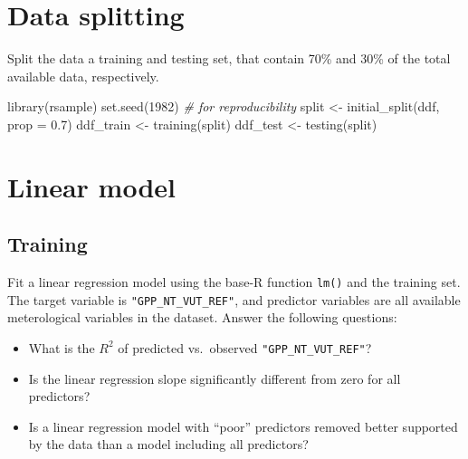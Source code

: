\documentclass[
]{book}
\newenvironment{Shaded}{\begin{snugshade}}{\end{snugshade}}
\newcommand{\AttributeTok}[1]{\textcolor[rgb]{0.77,0.63,0.00}{#1}}
\newcommand{\CommentTok}[1]{\textcolor[rgb]{0.56,0.35,0.01}{\textit{#1}}}
\newcommand{\DecValTok}[1]{\textcolor[rgb]{0.00,0.00,0.81}{#1}}
\newcommand{\FloatTok}[1]{\textcolor[rgb]{0.00,0.00,0.81}{#1}}
\newcommand{\FunctionTok}[1]{\textcolor[rgb]{0.00,0.00,0.00}{#1}}
\newcommand{\NormalTok}[1]{#1}
\newcommand{\OtherTok}[1]{\textcolor[rgb]{0.56,0.35,0.01}{#1}}
\providecommand{\tightlist}{%
  \setlength{\itemsep}{0pt}\setlength{\parskip}{0pt}}
\begin{document}
\hypertarget{data-splitting-2}{%
\section{Data splitting}\label{data-splitting-2}}

Split the data a training and testing set, that contain 70\% and 30\% of the total available data, respectively.

\begin{Shaded}
\begin{Highlighting}[]
\FunctionTok{library}\NormalTok{(rsample)}
\FunctionTok{set.seed}\NormalTok{(}\DecValTok{1982}\NormalTok{)  }\CommentTok{\# for reproducibility}
\NormalTok{split }\OtherTok{\textless{}{-}} \FunctionTok{initial\_split}\NormalTok{(ddf, }\AttributeTok{prop =} \FloatTok{0.7}\NormalTok{)}
\NormalTok{ddf\_train }\OtherTok{\textless{}{-}} \FunctionTok{training}\NormalTok{(split)}
\NormalTok{ddf\_test }\OtherTok{\textless{}{-}} \FunctionTok{testing}\NormalTok{(split)}
\end{Highlighting}
\end{Shaded}

\hypertarget{linear-model-1}{%
\section{Linear model}\label{linear-model-1}}

\hypertarget{training-4}{%
\subsection{Training}\label{training-4}}

Fit a linear regression model using the base-R function \texttt{lm()} and the training set. The target variable is \texttt{"GPP\_NT\_VUT\_REF"}, and predictor variables are all available meterological variables in the dataset. Answer the following questions:

\begin{itemize}
\tightlist
\item
  What is the \(R^2\) of predicted vs.~observed \texttt{"GPP\_NT\_VUT\_REF"}?
\item
  Is the linear regression slope significantly different from zero for all predictors?
\item
  Is a linear regression model with ``poor'' predictors removed better supported by the data than a model including all predictors?
\end{itemize}
\end{document}
